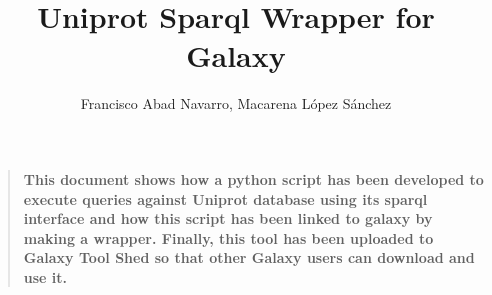 \documentclass[12pt]{article}
\title{Uniprot Sparql Wrapper for Galaxy}
\author
{Francisco Abad Navarro, Macarena L\'opez S\'anchez}
\date{}
\newenvironment{sciabstract}{%
\begin{quote} \bf}
{\end{quote}}
\begin{document}
 


\baselineskip24pt


\maketitle 




\begin{sciabstract}
  This document shows how a python script has been developed to execute queries against Uniprot database using its sparql interface and how this script has been linked to galaxy by making a wrapper. Finally, this tool has been uploaded to Galaxy Tool Shed so that other Galaxy users can download and use it.
\end{sciabstract}



\end{document}
